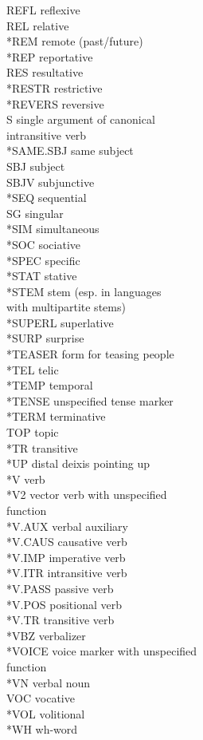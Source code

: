 \documentclass[a4paper, 11pt]{book}
\begin{document}
\begin{multicols}{2}
\begin{tabbing}
	REFL \> reflexive \\
	REL \> relative \\
	*REM \> remote (past/future) \\
	*REP \> reportative \\
	RES \> resultative \\
	*RESTR \> restrictive \\
	*REVERS \> reversive \\
	S \> single argument of canonical\\
		\> intransitive verb \\
	*SAME.SBJ \> same subject \\
	SBJ \> subject \\
	SBJV \> subjunctive \\
	*SEQ \> sequential \\
	SG \> singular \\
	*SIM \> simultaneous \\
	*SOC \> sociative \\
	*SPEC \> specific \\
	*STAT \> stative \\
	*STEM \> stem (esp. in languages\\
		\> with multipartite stems) \\
	*SUPERL \> superlative \\
	*SURP \> surprise \\
	*TEASER \> form for teasing people \\
	*TEL \> telic \\
	*TEMP \> temporal \\
	*TENSE \> unspecified tense marker \\
	*TERM \> terminative \\
	TOP \> topic \\
	*TR \> transitive \\
	*UP \> distal deixis pointing up \\
	*V \> verb \\
	*V2 \> vector verb with unspecified\\
		\> function \\
	*V.AUX \> verbal auxiliary \\
	*V.CAUS \> causative verb \\
	*V.IMP \> imperative verb \\
	*V.ITR \> intransitive verb \\
	*V.PASS \> passive verb \\
	*V.POS \> positional verb \\
	*V.TR \> transitive verb \\
	*VBZ \> verbalizer \\
	*VOICE \> voice marker with unspecified\\
		\> function \\
	*VN \> verbal noun \\
	VOC \> vocative \\
	*VOL \> volitional \\
	*WH \> wh-word \\

	\end{tabbing}
\end{multicols}
\end{document}
